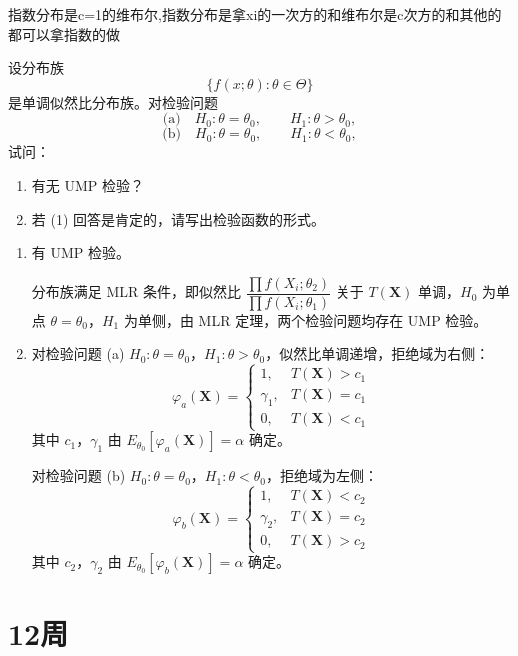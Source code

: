 \begin{dxtips}
    指数分布是c=1的维布尔,指数分布是拿xi的一次方的和维布尔是c次方的和其他的都可以拿指数的做
\end{dxtips}
\begin{homework}[7]
设分布族
\[
    \{f(x;\theta):\theta\in\Theta\}
\]
是单调似然比分布族。对检验问题
\[
    \text{(a)}\quad H_0:\theta=\theta_0,\qquad H_1:\theta>\theta_0,
\]
\[
    \text{(b)}\quad H_0:\theta=\theta_0,\qquad H_1:\theta<\theta_0,
\]
试问：
\begin{enumerate}
    \item 有无 UMP 检验？
    \item 若 (1) 回答是肯定的，请写出检验函数的形式。
\end{enumerate}
\end{homework}
\begin{solution}
\begin{enumerate}
    \item[(1)] 有 UMP 检验。

    分布族满足 MLR 条件，即似然比 $\dfrac{\prod f(X_i;\theta_2)}{\prod f(X_i;\theta_1)}$ 关于 $T(\boldsymbol{X})$ 单调，$H_0$ 为单点 $\theta = \theta_0$，$H_1$ 为单侧，由 MLR 定理，两个检验问题均存在 UMP 检验。

    \item[(2)] 对检验问题 (a) $H_0: \theta = \theta_0$，$H_1: \theta > \theta_0$，似然比单调递增，拒绝域为右侧：
    \[
    \varphi_a(\boldsymbol{X}) = \begin{cases} 1, & T(\boldsymbol{X}) > c_1 \\ \gamma_1, & T(\boldsymbol{X}) = c_1 \\ 0, & T(\boldsymbol{X}) < c_1 \end{cases}
    \]
    其中 $c_1$，$\gamma_1$ 由 $E_{\theta_0}[\varphi_a(\boldsymbol{X})] = \alpha$ 确定。

    对检验问题 (b) $H_0: \theta = \theta_0$，$H_1: \theta < \theta_0$，拒绝域为左侧：
    \[
    \varphi_b(\boldsymbol{X}) = \begin{cases} 1, & T(\boldsymbol{X}) < c_2 \\ \gamma_2, & T(\boldsymbol{X}) = c_2 \\ 0, & T(\boldsymbol{X}) > c_2 \end{cases}
    \]
    其中 $c_2$，$\gamma_2$ 由 $E_{\theta_0}[\varphi_b(\boldsymbol{X})] = \alpha$ 确定。
\end{enumerate}
\end{solution}
\section{12周}

